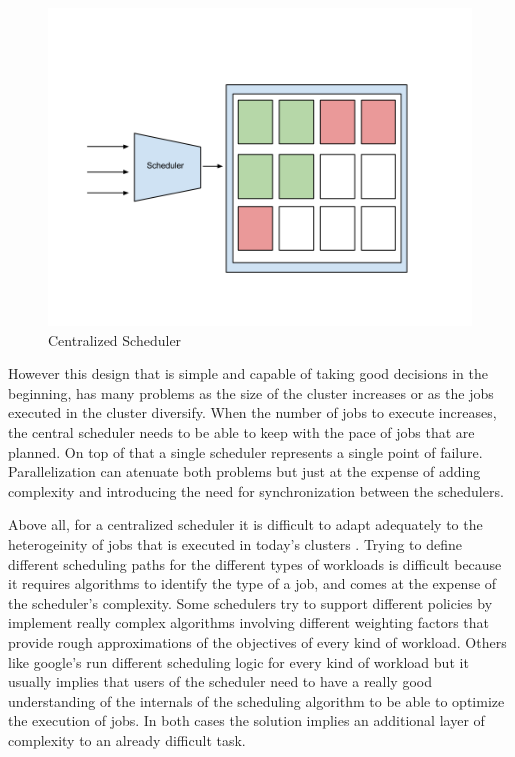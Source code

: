 \documentclass{svjour3}                     %
\begin{document}
\begin{figure}[!ht]
  \centering
  \includegraphics[scale=0.25,natwidth=960,natheight=720]{CentralizedScheduler.png}
  \caption{Centralized Scheduler}
  \label{fig:centralized}
\end{figure}

However this design that is simple and capable of taking good
decisions in the beginning, has many problems as the size of the
cluster increases or as the jobs executed in the cluster
diversify. When the number of jobs to execute increases, the central
scheduler needs to be able to keep with the pace of jobs that are
planned. On top of that a single scheduler represents a single point
of failure. Parallelization can atenuate both problems but just at the
expense of adding complexity and introducing the need for synchronization
between the schedulers.

Above all, for a centralized scheduler it is difficult to adapt
adequately to the heterogeinity of jobs that is executed in today's
clusters \cite{37201}. Trying to define different
scheduling paths for the different types of workloads is difficult
because it requires algorithms to identify the type of a job, and comes
at the expense of the scheduler's complexity. Some schedulers try to
support different policies by implement really complex algorithms
involving different weighting factors that provide rough
approximations of the objectives of every kind of workload. Others
like google's run different scheduling logic for every kind of
workload but it usually implies that users of the scheduler need to
have a really good understanding of the internals of the scheduling
algorithm to be able to optimize the execution of jobs. In both cases
the solution implies an additional layer of complexity to an already
difficult task.
\end{document}
